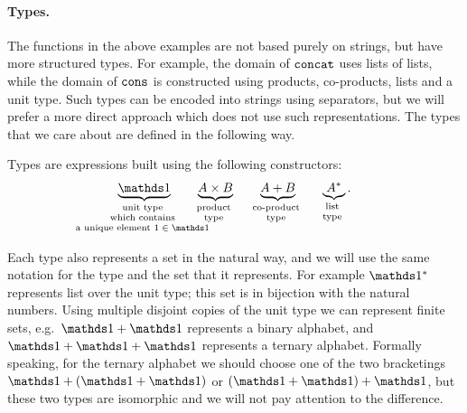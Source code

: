 \paragraph*{Types.} The functions in the above examples are not based purely on strings, but have more structured types. For example, the domain of $\mathtt{concat}$ uses lists of lists, while the domain of $\mathtt{cons}$ is constructed using products, co-products, lists and a unit type. Such types can be encoded into strings using separators, but we will prefer a more direct approach which does not use such representations. The types that we care about are defined in the following way. 
\begin{definition}
    [Types]\label{def:types} Types are expressions built using the following constructors:
\begin{align*}
    \myunderbrace{\onetype}{unit  type \\ which contains \\ a unique element $1 \in \onetype$} 
\qquad
\myunderbrace{A \times B}{product \\ type}
\qquad
\myunderbrace{A + B}{co-product \\ type}
\qquad
\myunderbrace{A^*}{list \\ type}.
\end{align*}
\end{definition}

Each type also represents a set in the natural way, and we will use the same notation for the type and the set that it represents. For example $\onetype^*$ represents list over the unit type; this set is in bijection with the natural numbers. Using multiple disjoint copies of the unit type we can represent finite sets, e.g.~$\onetype + \onetype$ represents a binary alphabet, and $\onetype + \onetype + \onetype$ represents a ternary alphabet. Formally speaking, for the ternary alphabet we should choose one of the two bracketings $\onetype + (\onetype + \onetype)$ or $(\onetype + \onetype) + \onetype$, but these two types are isomorphic and we will not  pay attention to the difference.

